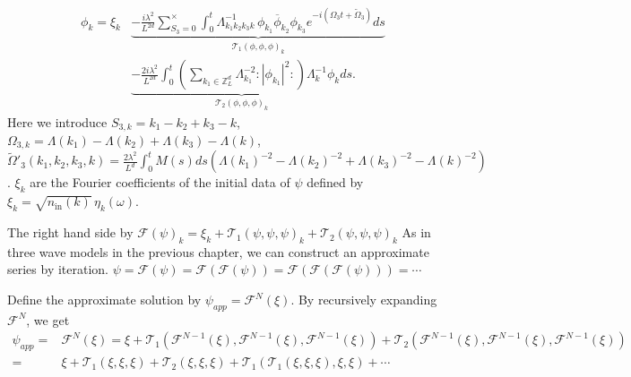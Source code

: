 \begin{equation}\label{eq.intmainintro.fourwave}
 \begin{split}
 \phi_k =\xi_k
 &\underbrace{- \frac{i\lambda^2}{L^{2d}} \sum\limits^{\times}_{S_3=0} \int^{t}_0 \Lambda_{k_1k_2k_3k}^{-1}\,\phi_{k_1}\overline{\phi}_{k_2} \phi_{k_3}e^{- i (\Omega_3t+\widetilde{\Omega}_3)} ds}_{\mathcal{T}_1(\phi,\phi,\phi)_k}
 \\
 &\underbrace{- \frac{2i\lambda^2}{L^{2d}} \int^{t}_0 \left(\sum\limits_{k_1\in \mathbb{Z}^d_L} \Lambda_{k_1}^{-2}:|\phi_{k_1}|^2: \right) \Lambda_{k}^{-1}\phi_{k} ds}_{\mathcal{T}_2(\phi,\phi,\phi)_k}.
 \end{split}
 \end{equation}
Here we introduce $S_{3,k}=k_1-k_2+k_3-k$, $\Omega_{3,k}=\Lambda(k_1)-\Lambda(k_2)+\Lambda(k_3)-\Lambda(k)$, $\widetilde{\Omega}'_3(k_1,k_2,k_3,k)=\frac{2\lambda^2}{L^{d}} \int^t_{0}M(s) ds\left(\Lambda(k_1)^{-2}-\Lambda(k_2)^{-2}+\Lambda(k_3)^{-2}-\Lambda(k)^{-2}\right)$. $\xi_k$ are the Fourier coefficients of the initial data of $\psi$ defined by $\xi_k=\sqrt{n_{\textrm{in}}(k)} \, \eta_{k}(\omega)$.

The right hand side by $\mathcal{F}(\psi)_k=\xi_k+\mathcal{T}_1(\psi,\psi,\psi)_k + \mathcal{T}_2(\psi,\psi,\psi)_k$ As in three wave models in the previous chapter, we can construct an approximate series by iteration. $\psi=\mathcal{F}(\psi)=\mathcal{F}(\mathcal{F}(\psi))=\mathcal{F}(\mathcal{F}(\mathcal{F}(\psi)))=\cdots$


Define the approximate solution by $\psi_{app}=\mathcal{F}^{N}(\xi)$. By recursively expanding $\mathcal{F}^{N}$, we get 
\begin{equation*}
\begin{split}
 \psi_{app}=&\mathcal{F}^{N}(\xi)=\xi+\mathcal{T}_1(\mathcal{F}^{N-1}(\xi),\mathcal{F}^{N-1}(\xi),\mathcal{F}^{N-1}(\xi)) + \mathcal{T}_2(\mathcal{F}^{N-1}(\xi),\mathcal{F}^{N-1}(\xi),\mathcal{F}^{N-1}(\xi))
 \\
 =&\xi+\mathcal{T}_1(\xi,\xi,\xi)+ \mathcal{T}_2(\xi,\xi,\xi) +\mathcal{T}_1(\mathcal{T}_1(\xi,\xi,\xi),\xi,\xi)
 +\cdots
\end{split} 
\end{equation*}

